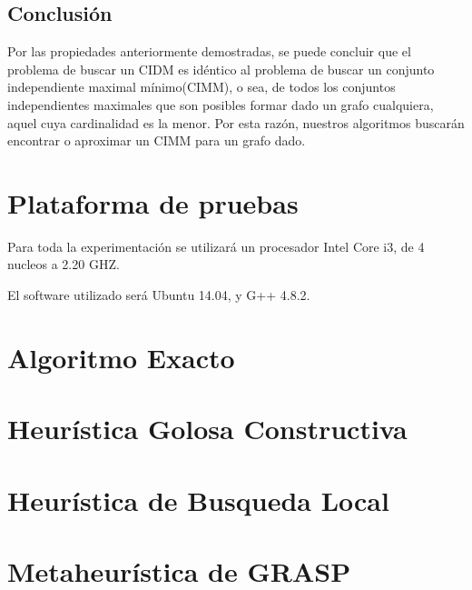 \documentclass[a4paper]{article}
\begin{document}
\subsection{Conclusión}
Por las propiedades anteriormente demostradas, se puede concluir que el problema de buscar un CIDM es idéntico al problema de buscar un conjunto independiente maximal mínimo(CIMM), o sea, de todos los conjuntos independientes maximales que son posibles formar dado un grafo cualquiera, aquel cuya cardinalidad es la menor. Por esta razón, nuestros algoritmos buscarán encontrar o aproximar un CIMM para un grafo dado.

\section{Plataforma de pruebas}

Para toda la experimentación se utilizará un procesador Intel Core i3, de 4 nucleos a 2.20 GHZ.

El software utilizado será Ubuntu 14.04, y G++ 4.8.2.


\section{Algoritmo Exacto}


\newpage
\section{Heurística Golosa Constructiva}


\newpage
\section{Heurística de Busqueda Local}


\newpage
\section{Metaheurística de GRASP}


%
%
%
%
%
%
%
%
%
\end{document}
